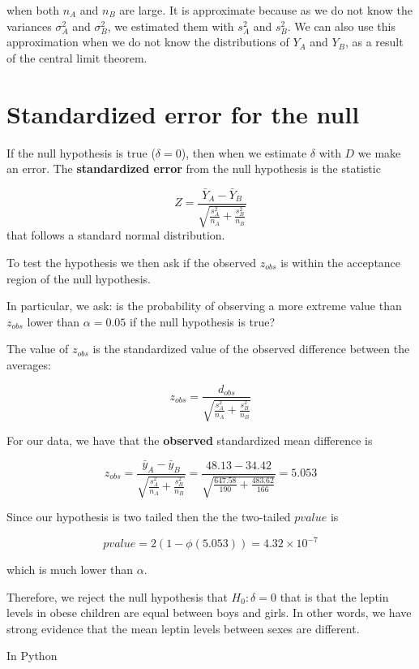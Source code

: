 \documentclass[
]{book}
\begin{document}
when both \(n_A\) and \(n_B\) are large. It is approximate because as we do not know the variances \(\sigma^2_A\) and \(\sigma^2_B\), we estimated them with \(s_A^2\) and \(s_B^2\). We can also use this approximation when we do not know the distributions of \(Y_A\) and \(Y_B\), as a result of the central limit theorem.

\hypertarget{standardized-error-for-the-null}{%
\section{Standardized error for the null}\label{standardized-error-for-the-null}}

If the null hypothesis is true (\(\delta=0\)), then when we estimate \(\delta\) with \(D\) we make an error. The \textbf{standardized error} from the null hypothesis is the statistic

\[Z=\frac{\bar{Y}_A-\bar{Y}_B}{\sqrt{\frac{s_A^2}{n_A}+\frac{s^2_B}{n_B}}}\]
that follows a standard normal distribution.

To test the hypothesis we then ask if the observed \(z_{obs}\) is within the acceptance region of the null hypothesis.

In particular, we ask: is the probability of observing a more extreme value than \(z_{obs}\) lower than \(\alpha=0.05\) if the null hypothesis is true?

The value of \(z_{obs}\) is the standardized value of the observed difference between the averages:

\[z_{obs}=\frac{d_{obs}}{\sqrt{\frac{s_A^2}{n_A}+\frac{s^2_B}{n_B}}}\]

For our data, we have that the \textbf{observed} standardized mean difference is

\[z_{obs}=\frac{\bar{y}_A-\bar{y}_B }{\sqrt{\frac{s^2_A}{n_A}+\frac{s^2_B}{n_B}}}=\frac{48.13-34.42}{\sqrt{\frac{647.58}{190}+\frac{483.62}{166}}}=5.053\]

Since our hypothesis is two tailed then the the two-tailed \(pvalue\) is

\[pvalue=2(1-\phi(5.053))=4.32 \times 10^{-7}\]

which is much lower than \(\alpha\).

Therefore, we reject the null hypothesis that \(H_0:\delta=0\) that is that the leptin levels in obese children are equal between boys and girls. In other words, we have strong evidence that the mean leptin levels between sexes are different.

In Python
\end{document}
